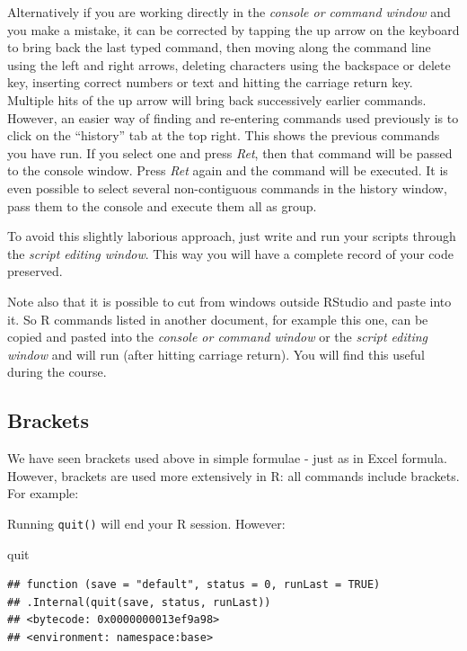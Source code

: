 \documentclass[
]{book}
\makeatletter
\newenvironment{Shaded}{\begin{snugshade}}{\end{snugshade}}
\newcommand{\NormalTok}[1]{#1}
\newenvironment{kframe}{%
\medskip{}
\setlength{\fboxsep}{.8em}
 \def\at@end@of@kframe{}%
 \ifinner\ifhmode%
  \def\at@end@of@kframe{\end{minipage}}%
  \begin{minipage}{\columnwidth}%
 \fi\fi%
 \def\FrameCommand##1{\hskip\@totalleftmargin \hskip-\fboxsep
 \colorbox{shadecolor}{##1}\hskip-\fboxsep
     \hskip-\linewidth \hskip-\@totalleftmargin \hskip\columnwidth}%
 \MakeFramed {\advance\hsize-\width
   \@totalleftmargin\z@ \linewidth\hsize
   \@setminipage}}%
 {\par\unskip\endMakeFramed%
 \at@end@of@kframe}
\newenvironment{rmdblock}[1]
  {
  \begin{itemize}
  \renewcommand{\labelitemi}{
    \raisebox{-.7\height}[0pt][0pt]{
      {\setkeys{Gin}{width=3em,keepaspectratio}\texttt{[image: images/\#1]}}
    }
  }
  \setlength{\fboxsep}{1em}
  \begin{kframe}
  \item
  }
  {
  \end{kframe}
  \end{itemize}
  }
\newenvironment{rmdnote}
  {\begin{rmdblock}{note}}
  {\end{rmdblock}}
\makeatother
\begin{document}
Alternatively if you are working directly in the \emph{console or command window} and you make a mistake, it can be corrected by tapping the up arrow on the keyboard to bring back the last typed command, then moving along the command line using the left and right arrows, deleting characters using the backspace or delete key, inserting correct numbers or text and hitting the carriage return key. Multiple hits of the up arrow will bring back successively earlier commands. However, an easier way of finding and re-entering commands used previously is to click on the ``history'' tab at the top right. This shows the previous commands you have run. If you select one and press \emph{Ret}, then that command will be passed to the console window. Press \emph{Ret} again and the command will be executed. It is even possible to select several non-contiguous commands in the history window, pass them to the console and execute them all as group.

To avoid this slightly laborious approach, just write and run your scripts through the \emph{script editing window}. This way you will have a complete record of your code preserved.

\begin{rmdnote}
Note also that it is possible to cut from windows outside RStudio and paste into it. So R commands listed in another document, for example this one, can be copied and pasted into the \emph{console or command window} or the \emph{script editing window} and will run (after hitting carriage return). You will find this useful during the course.
\end{rmdnote}

\hypertarget{brackets}{%
\subsection{Brackets}\label{brackets}}

We have seen brackets used above in simple formulae - just as in Excel formula. However, brackets are used more extensively in R: all commands include brackets. For example:

Running \texttt{quit()} will end your R session. However:

\begin{Shaded}
\begin{Highlighting}[]
\NormalTok{quit}
\end{Highlighting}
\end{Shaded}

\begin{verbatim}
## function (save = "default", status = 0, runLast = TRUE) 
## .Internal(quit(save, status, runLast))
## <bytecode: 0x0000000013ef9a98>
## <environment: namespace:base>
\end{verbatim}
\end{document}
